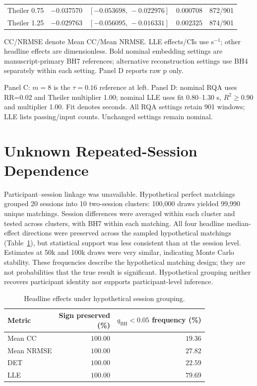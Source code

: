 \documentclass[conference,a4paper]{IEEEtran}
\begin{document}
\begin{table}[!t]
\begin{minipage}[t]{0.49\textwidth}
\begin{tabular*}{\linewidth}{@{\extracolsep{\fill}}lrcrr@{}}
Theiler 0.75 & $-0.037570$ & $[-0.053698,\,-0.022976]$ & $0.000708$ & 872/901\\
Theiler 1.25 & $-0.029763$ & $[-0.056095,\,-0.016331]$ & $0.002325$ & 874/901\\
\bottomrule
\end{tabular*}
\end{minipage}
\par\smallskip
\raggedright CC/NRMSE denote Mean CC/Mean NRMSE. LLE effects/CIs use s$^{-1}$; other headline effects are dimensionless. Bold nominal embedding settings are manuscript-primary BH7 references; alternative reconstruction settings use BH4 separately within each setting. Panel D reports raw p only.
\par\smallskip
\raggedright Panel C: $m=8$ is the $\tau=0.16$ reference at left. Panel D: nominal RQA uses RR=0.02 and Theiler multiplier 1.00; nominal LLE uses fit 0.80--1.30 s, $R^2\geq0.90$ and multiplier 1.00. Fit denotes seconds. All RQA settings retain 901 windows; LLE lists passing/input counts. Unchanged settings remain nominal.
\end{table}
\FloatBarrier
\section{Unknown Repeated-Session Dependence}\label{sec:supp_7}
Participant--session linkage was unavailable. Hypothetical perfect matchings grouped 20 sessions into 10 two-session clusters: 100,000 draws yielded 99,990 unique matchings. Session differences were averaged within each cluster and tested across clusters, with BH7 within each matching. All four headline median-effect directions were preserved across the sampled hypothetical matchings (Table~\ref{tab:supp_dependence}), but statistical support was less consistent than at the session level. Estimates at 50k and 100k draws were very similar, indicating Monte Carlo stability. These frequencies describe the hypothetical matching design; they are not probabilities that the true result is significant. Hypothetical grouping neither recovers participant identity nor supports participant-level inference.

\begin{table}[!t]
\centering
\caption{Headline effects under hypothetical session grouping.}\label{tab:supp_dependence}
\footnotesize
\setlength{\tabcolsep}{3pt}
\renewcommand{\arraystretch}{1.05}
\begin{tabular}{@{}lrr@{}}
\toprule
Metric & \makecell{Sign preserved\\(\%)} & \makecell{$q_{\mathrm{BH}}<0.05$\\frequency (\%)}\\
\midrule
Mean CC & $100.00$ & $19.36$\\
Mean NRMSE & $100.00$ & $27.82$\\
DET & $100.00$ & $22.59$\\
LLE & $100.00$ & $79.69$\\
\bottomrule
\end{tabular}
\end{table}
\FloatBarrier
\end{document}
